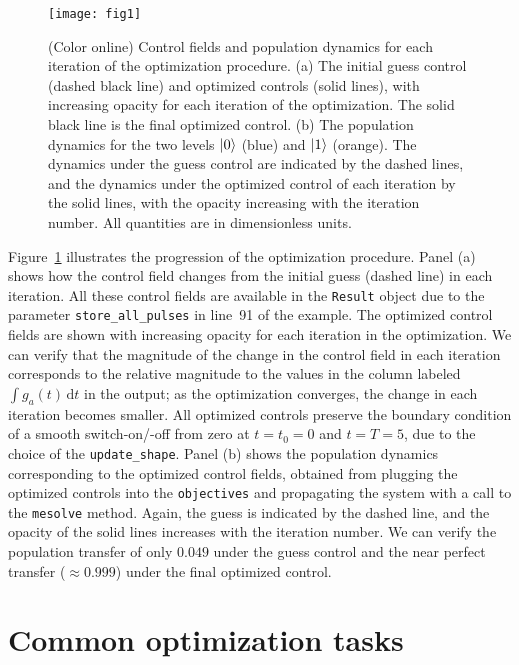 \documentclass[submission, Phys]{SciPost}
\newcommand{\dd}[0]{\,\text{d}}
\begin{document}
\begin{figure}[tb]
  \centering
  \texttt{[image: fig1]}
  \caption{(Color online) Control fields and population dynamics for each
  iteration of the optimization procedure.
  (a) The initial guess control (dashed black line) and optimized controls
  (solid lines), with increasing opacity for each iteration of the optimization.
  The solid black line is the final optimized control.
  (b) The population dynamics for the two levels $\ket{0}$ (blue) and $\ket{1}$
  (orange).  The dynamics under the guess control are indicated by the dashed
  lines, and the dynamics under the optimized control of each iteration by the
  solid lines, with the opacity increasing with the iteration number. All
  quantities are in dimensionless units.
  }%
  \label{fig:tls_example}
\end{figure}
Figure~\ref{fig:tls_example} illustrates the progression of the optimization
procedure.
Panel (a) shows how the control field changes from the initial guess (dashed
line) in each iteration.
All these control fields are available in the \texttt{Result} object due to the
parameter \texttt{store\_all\_pulses} in line~91 of the example.
The optimized control fields are shown with increasing opacity for each
iteration in the optimization.
We can verify that the magnitude of the change in the control field in each
iteration corresponds to the relative magnitude to the values in the column
labeled $\int g_a(t) \dd t$ in the output; as the optimization converges, the
change in each iteration becomes smaller.
All optimized controls preserve the boundary condition of a smooth
switch-on/-off from zero at $t=t_0=0$ and $t=T=5$, due to the choice of the
\texttt{update\_shape}.
Panel (b) shows the population dynamics corresponding to the optimized control
fields, obtained from plugging the optimized controls into the
\texttt{objectives} and propagating the system with a call to the
\texttt{mesolve} method.
Again, the guess is indicated by the dashed line, and the opacity of the solid
lines increases with the iteration number.
We can verify the population transfer of only $0.049$ under the guess control
and the near perfect transfer ($\approx 0.999$) under the final optimized
control.


\section{Common optimization tasks}%
\label{sec:common_optimization_tasks}
\end{document}
